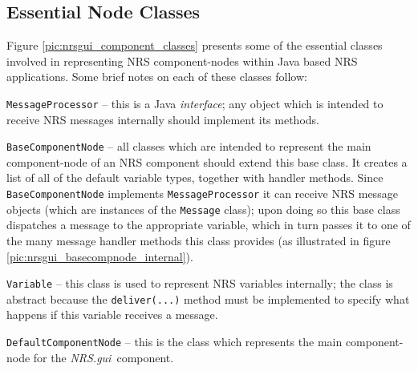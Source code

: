 \documentclass[pdftex,a4paper]{article}
\newif\ifpdf
\newcommand{\NRSgui}{{\it NRS.gui}}
\newcommand{\code}[1]{{\tt \small #1}}
\begin{document}
\subsection{Essential Node Classes}

Figure \ref{pic:nrsgui_component_classes} presents some of the essential
classes involved in representing NRS component-nodes within Java based
NRS applications. Some brief notes on each of these classes follow:

\ifpdf
\begin{figure}[htb]
  \begin{center}
    \texttt{[image: nrsgui\_component\_classes.pdf]}
    \caption{UML depiction of essential Java classes for representing
    component nodes (methods are not shown for \code{BaseComponentNode}
    and \code{DefaultComponentNode}). The three classes
    \code{MessageProcessor}, \code{BaseComponentNode} and
    \code{Variable} are classes that can be used in any Java NRS
    application, while \code{DefaultComponentNode} is very specific to
    the \NRSgui~component.}
    \label{pic:nrsgui_component_classes}
  \end{center}
\end{figure}
\fi


\begin{description}

\item{\code{MessageProcessor}} -- this is a Java {\it interface}; any
  object which is intended to receive NRS messages internally should
  implement its methods.

\item{\code{BaseComponentNode}} -- all classes which are intended to
  represent the main component-node of an NRS component should extend
  this base class. It creates a list of all of the default variable
  types, together with handler methods. Since \code{BaseComponentNode}
  implements \code{MessageProcessor} it can receive NRS message objects
  (which are instances of the \code{Message} class); upon doing so this
  base class dispatches a message to the appropriate variable, which in
  turn passes it to one of the many message handler methods this class
  provides (as illustrated in figure
  \ref{pic:nrsgui_basecompnode_internal}).

\item{\code{Variable}} -- this class is used to represent NRS variables
  internally; the class is abstract because the \code{deliver(...)}
  method must be implemented to specify what happens if this variable
  receives a message.

\item{\code{DefaultComponentNode}} -- this is the class which represents
  the main component-node for the \NRSgui~component.


\end{description}
\end{document}
